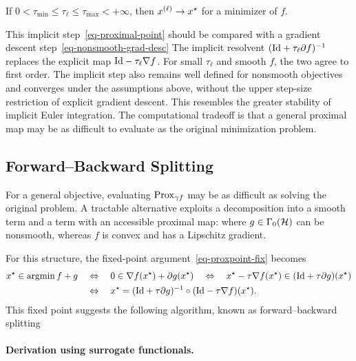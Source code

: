 \begin{thm}
	If $0<\tau_{\min} \leq \tau_\ell \leq \tau_{\max} < +\infty$, then $\it{x} \rightarrow x^\star$ for a minimizer of $f$.
\end{thm}

This implicit step~\eqref{eq-proximal-point} should be compared with a gradient descent step~\eqref{eq-nonsmooth-grad-desc}
The implicit resolvent $(\Id+\tau_\ell\partial f)^{-1}$ replaces the explicit map $\Id-\tau_\ell\nabla f$. For small $\tau_\ell$ and smooth $f$, the two agree to first order. The implicit step also remains well defined for nonsmooth objectives and converges under the assumptions above, without the upper step-size restriction of explicit gradient descent. This resembles the greater stability of implicit Euler integration. The computational tradeoff is that a general proximal map may be as difficult to evaluate as the original minimization problem.


\subsection{Forward--Backward Splitting}
\label{sec-fb}

For a general objective, evaluating $\Prox_{\ga f}$ may be as difficult as solving the original problem.
%
A tractable alternative exploits a decomposition into a smooth term and a term with an accessible proximal map:
where $g \in \Ga_0(\Hh)$ can be nonsmooth, whereas $f$ is convex and has a Lipschitz gradient.

For this structure, the fixed-point argument~\eqref{eq-proxpoint-fix} becomes
\begin{align*}
 	x^\star \in \argmin f + g
	& \quad\Leftrightarrow\quad
	0 \in \nabla f(x^\star) + \partial g(x^\star) 
	\quad\Leftrightarrow\quad
	x^\star - \tau \nabla f(x^\star) \in (\Id+\tau \partial g)(x^\star) \\
	& \quad\Leftrightarrow\quad
	x^\star = ( \Id + \tau \partial g )^{-1} \circ ( \Id - \tau \nabla f ) (x^\star).
\end{align*}
This fixed point suggests the following algorithm, known as forward--backward splitting


\paragraph{Derivation using surrogate functionals.}

